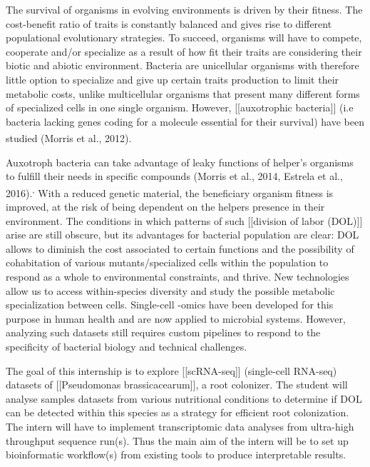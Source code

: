 \documentclass[
  11pt,
  a4paper,
]{report}
\begin{document}
The survival of organisms in evolving environments is driven by their
fitness. The cost-benefit ratio of traits is constantly balanced and
gives rise to different populational evolutionary strategies. To
succeed, organisms will have to compete, cooperate and/or specialize as
a result of how fit their traits are considering their biotic and
abiotic environment. Bacteria are unicellular organisms with therefore
little option to specialize and give up certain traits production to
limit their metabolic costs, unlike multicellular organisms that present
many different forms of specialized cells in one single organism.
However, {[}{[}auxotrophic bacteria{]}{]} (i.e bacteria lacking genes
coding for a molecule essential for their survival) have been studied
(Morris et al., 2012).\textsuperscript{}

Auxotroph bacteria can take advantage of leaky functions of helper's
organisms to fulfill their needs in specific compounds (Morris et al.,
2014, Estrela et al.,
2016).\textsuperscript{,}
With a reduced genetic material, the beneficiary organism fitness is
improved, at the risk of being dependent on the helpers presence in
their environment. The conditions in which patterns of such
{[}{[}division of labor (DOL){]}{]} arise are still obscure, but its
advantages for bacterial population are clear: DOL allows to diminish
the cost associated to certain functions and the possibility of
cohabitation of various mutants/specialized cells within the population
to respond as a whole to environmental constraints, and thrive. New
technologies allow us to access within-species diversity and study the
possible metabolic specialization between cells. Single-cell -omics have
been developed for this purpose in human health and are now applied to
microbial systems. However, analyzing such datasets still requires
custom pipelines to respond to the specificity of bacterial biology and
technical challenges.

The goal of this internship is to explore {[}{[}scRNA-seq{]}{]}
(single-cell RNA-seq) datasets of {[}{[}Pseudomonas
brassicacearum{]}{]}, a root colonizer. The student will analyse samples
datasets from various nutritional conditions to determine if DOL can be
detected within this species as a strategy for efficient root
colonization.~ The intern will have to implement transcriptomic data
analyses from ultra-high throughput sequence run(s). Thus the main aim
of the intern will be to set up bioinformatic workflow(s) from existing
tools to produce interpretable results.
\end{document}
